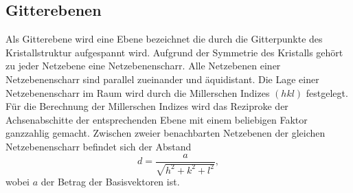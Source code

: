 \subsection{Gitterebenen}
\label{sec:miller}
Als Gitterebene wird eine Ebene bezeichnet die durch die Gitterpunkte des Kristallstruktur aufgespannt wird.
Aufgrund der Symmetrie des Kristalls gehört zu jeder Netzebene eine Netzebenenscharr.
Alle Netzebenen einer Netzebenenscharr sind parallel zueinander und äquidistant.
Die Lage einer Netzebenenscharr im Raum wird durch die Millerschen Indizes $(hkl)$ festgelegt.
Für die Berechnung der Millerschen Indizes wird das Reziproke der Achsenabschitte der entsprechenden Ebene mit einem beliebigen Faktor ganzzahlig gemacht.
Zwischen zweier benachbarten Netzebenen der gleichen Netzebenenscharr befindet sich der Abstand
\begin{equation}
  d=\frac{a}{\sqrt{h^2+k^2+l^2}},
\end{equation}
wobei $a$ der Betrag der Basisvektoren ist.


